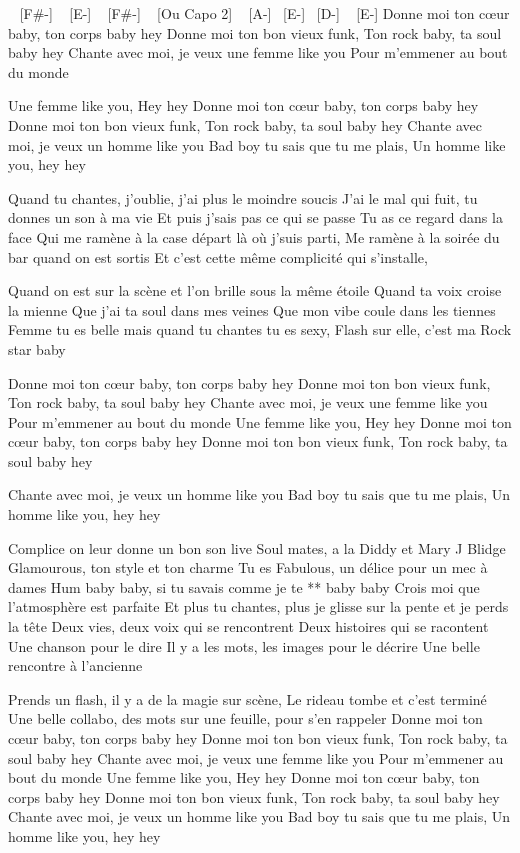 
\begin{guitar}
[B-] ~ [F#-] ~ [E-] ~ [F#-] ~
[Ou Capo 2] ~ [A-] ~[E-] ~[D-] ~ [E-] 
 Donne moi ton cœur baby, ton corps baby hey
Donne moi ton bon vieux funk,
Ton rock baby, ta soul baby hey
Chante avec moi, je veux une femme like you
Pour m'emmener au bout du monde

Une femme like you, Hey hey
Donne moi ton cœur baby, ton corps baby hey
Donne moi ton bon vieux funk,
Ton rock baby, ta soul baby hey
Chante avec moi, je veux un homme like you
Bad boy tu sais que tu me plais,
Un homme like you, hey hey

Quand tu chantes, j'oublie, j'ai plus le moindre soucis
J'ai le mal qui fuit, tu donnes un son à ma vie
Et puis j'sais pas ce qui se passe
Tu as ce regard dans la face
Qui me ramène à la case départ là où j'suis parti,
Me ramène à la soirée du bar quand on est sortis
Et c'est cette même complicité qui s'installe,

Quand on est sur la scène et l'on brille sous la même étoile
Quand ta voix croise la mienne
Que j'ai ta soul dans mes veines
Que mon vibe coule dans les tiennes
Femme tu es belle mais quand tu chantes tu es sexy,
Flash sur elle, c'est ma Rock star baby

Donne moi ton cœur baby, ton corps baby hey
Donne moi ton bon vieux funk,
Ton rock baby, ta soul baby hey
Chante avec moi, je veux une femme like you
Pour m'emmener au bout du monde
Une femme like you, Hey hey
Donne moi ton cœur baby, ton corps baby hey
Donne moi ton bon vieux funk,
Ton rock baby, ta soul baby hey

Chante avec moi, je veux un homme like you
Bad boy tu sais que tu me plais,
Un homme like you, hey hey

Complice on leur donne un bon son live
Soul mates, a la Diddy et Mary J Blidge
Glamourous, ton style et ton charme
Tu es Fabulous, un délice pour un mec à dames
Hum baby baby, si tu savais comme je te ** baby baby
Crois moi que l'atmosphère est parfaite
Et plus tu chantes, plus je glisse sur la pente et je perds la tête
Deux vies, deux voix qui se rencontrent
Deux histoires qui se racontent
Une chanson pour le dire
Il y a les mots, les images pour le décrire
Une belle rencontre à l'ancienne

Prends un flash, il y a de la magie sur scène,
Le rideau tombe et c'est terminé
Une belle collabo, des mots sur une feuille, pour s'en rappeler
Donne moi ton cœur baby, ton corps baby hey
Donne moi ton bon vieux funk,
Ton rock baby, ta soul baby hey
Chante avec moi, je veux une femme like you
Pour m'emmener au bout du monde
Une femme like you, Hey hey
Donne moi ton cœur baby, ton corps baby hey
Donne moi ton bon vieux funk,
Ton rock baby, ta soul baby hey
Chante avec moi, je veux un homme like you
Bad boy tu sais que tu me plais,
Un homme like you, hey hey 


\end{guitar}